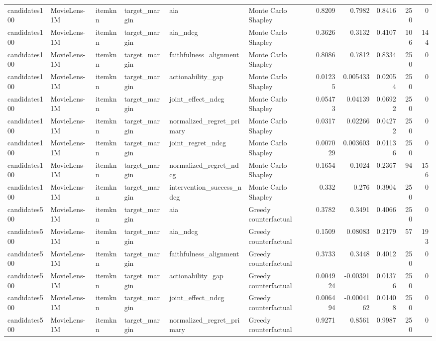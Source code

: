 \begin{table}[t]
{\begin{tabular}{llllllrrrrr}
candidates100 & MovieLens-1M & itemknn & target\_margin & aia & Monte Carlo Shapley & 0.8209 & 0.7982 & 0.8416 & 250 & 0 \\
candidates100 & MovieLens-1M & itemknn & target\_margin & aia\_ndcg & Monte Carlo Shapley & 0.3626 & 0.3132 & 0.4107 & 106 & 144 \\
candidates100 & MovieLens-1M & itemknn & target\_margin & faithfulness\_alignment & Monte Carlo Shapley & 0.8086 & 0.7812 & 0.8334 & 250 & 0 \\
candidates100 & MovieLens-1M & itemknn & target\_margin & actionability\_gap & Monte Carlo Shapley & 0.01235 & 0.005433 & 0.02054 & 250 & 0 \\
candidates100 & MovieLens-1M & itemknn & target\_margin & joint\_effect\_ndcg & Monte Carlo Shapley & 0.05473 & 0.04139 & 0.06922 & 250 & 0 \\
candidates100 & MovieLens-1M & itemknn & target\_margin & normalized\_regret\_primary & Monte Carlo Shapley & 0.0317 & 0.02266 & 0.04272 & 250 & 0 \\
candidates100 & MovieLens-1M & itemknn & target\_margin & joint\_regret\_ndcg & Monte Carlo Shapley & 0.007029 & 0.003603 & 0.01136 & 250 & 0 \\
candidates100 & MovieLens-1M & itemknn & target\_margin & normalized\_regret\_ndcg & Monte Carlo Shapley & 0.1654 & 0.1024 & 0.2367 & 94 & 156 \\
candidates100 & MovieLens-1M & itemknn & target\_margin & intervention\_success\_ndcg & Monte Carlo Shapley & 0.332 & 0.276 & 0.3904 & 250 & 0 \\
candidates500 & MovieLens-1M & itemknn & target\_margin & aia & Greedy counterfactual & 0.3782 & 0.3491 & 0.4066 & 250 & 0 \\
candidates500 & MovieLens-1M & itemknn & target\_margin & aia\_ndcg & Greedy counterfactual & 0.1509 & 0.08083 & 0.2179 & 57 & 193 \\
candidates500 & MovieLens-1M & itemknn & target\_margin & faithfulness\_alignment & Greedy counterfactual & 0.3733 & 0.3448 & 0.4012 & 250 & 0 \\
candidates500 & MovieLens-1M & itemknn & target\_margin & actionability\_gap & Greedy counterfactual & 0.004924 & -0.00391 & 0.01376 & 250 & 0 \\
candidates500 & MovieLens-1M & itemknn & target\_margin & joint\_effect\_ndcg & Greedy counterfactual & 0.006494 & -0.0004162 & 0.01408 & 250 & 0 \\
candidates500 & MovieLens-1M & itemknn & target\_margin & normalized\_regret\_primary & Greedy counterfactual & 0.9271 & 0.8561 & 0.9987 & 250 & 0 \\

\end{tabular}}
\end{table}
